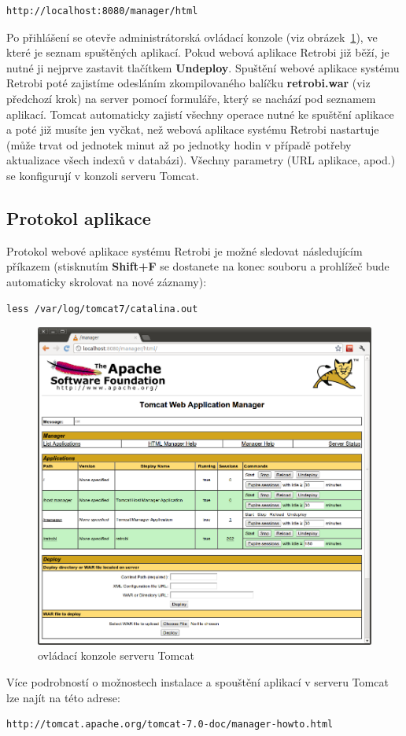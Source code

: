 \begin{verbatim}
http://localhost:8080/manager/html
\end{verbatim}

Po přihlášení se otevře administrátorská ovládací konzole (viz obrázek~\ref{fig:tomcat}), ve které je seznam spuštěných aplikací. Pokud webová aplikace Retrobi již běží, je nutné ji nejprve zastavit tlačítkem {\bf Undeploy}. Spuštění webové aplikace systému Retrobi poté zajistíme odesláním zkompilovaného balíčku {\bf retrobi.war} (viz předchozí krok) na server pomocí formuláře, který se nachází pod seznamem aplikací. Tomcat automaticky zajistí všechny operace nutné ke spuštění aplikace a poté již musíte jen vyčkat, než webová aplikace systému Retrobi nastartuje (může trvat od jednotek minut až po jednotky hodin v případě potřeby aktualizace všech indexů v databázi). Všechny parametry (URL aplikace, apod.) se konfigurují v konzoli serveru Tomcat. 

\subsection{Protokol aplikace}

Protokol webové aplikace systému Retrobi je možné sledovat následujícím příkazem (stisknutím {\bf Shift+F} se dostanete na konec souboru a prohlížeč bude automaticky skrolovat na nové záznamy):

\begin{verbatim}
less /var/log/tomcat7/catalina.out
\end{verbatim}

\begin{figure}
\centering
\includegraphics[width=\textwidth]{tomcat.png}
\caption{ovládací konzole serveru Tomcat}
\label{fig:tomcat}
\end{figure}

Více podrobností o možnostech instalace a spouštění aplikací v serveru Tomcat lze najít na této adrese:

\begin{verbatim}
http://tomcat.apache.org/tomcat-7.0-doc/manager-howto.html
\end{verbatim}
